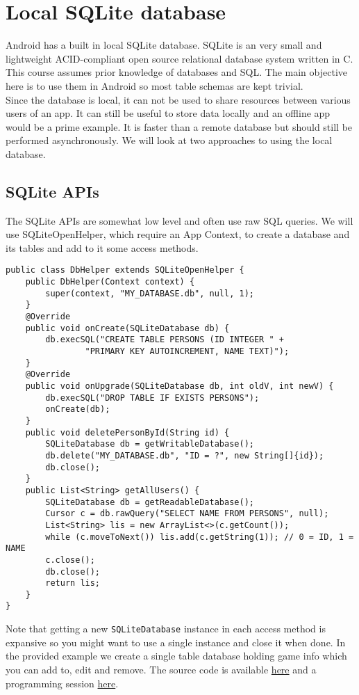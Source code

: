 \section{Local SQLite database}
Android has a built in local SQLite database. SQLite is an very small and lightweight ACID-compliant open source relational database system written in C. This course assumes prior knowledge of databases and SQL. The main objective here is to use them in Android so most table schemas are kept trivial.\\

Since the database is local, it can not be used to share resources between various users of an app. It can still be useful to store data locally and an offline app would be a prime example. It is faster than a remote database but should still be performed asynchronously. We will look at two approaches to using the local database. 

\subsection{SQLite APIs}
The SQLite APIs are somewhat low level and often use raw SQL queries. We will use SQLiteOpenHelper, which require an App Context, to create a database and its tables and add to it some access methods.

\begin{lstlisting}[style=A_Java]
public class DbHelper extends SQLiteOpenHelper {
    public DbHelper(Context context) {
        super(context, "MY_DATABASE.db", null, 1);
    }
    @Override
    public void onCreate(SQLiteDatabase db) {
        db.execSQL("CREATE TABLE PERSONS (ID INTEGER " +
                "PRIMARY KEY AUTOINCREMENT, NAME TEXT)");
    }
    @Override
    public void onUpgrade(SQLiteDatabase db, int oldV, int newV) {
        db.execSQL("DROP TABLE IF EXISTS PERSONS");
        onCreate(db);
    }
    public void deletePersonById(String id) {
        SQLiteDatabase db = getWritableDatabase();
        db.delete("MY_DATABASE.db", "ID = ?", new String[]{id});
        db.close();
    }
    public List<String> getAllUsers() {
        SQLiteDatabase db = getReadableDatabase();
        Cursor c = db.rawQuery("SELECT NAME FROM PERSONS", null);
        List<String> lis = new ArrayList<>(c.getCount());
        while (c.moveToNext()) lis.add(c.getString(1)); // 0 = ID, 1 = NAME
        c.close();
        db.close();
        return lis;
    }
}
\end{lstlisting}
Note that getting a new \texttt{SQLiteDatabase} instance in each access method is expansive so you might want to use a single instance and close it when done. In the provided example we create a single table database holding game info which you can add to, edit and remove. The source code is available \href{https://github.com/JonSteinn/AndroidDevelopment/tree/master/examples/lab5/gamesdb}{here} and a programming session \href{TODO}{here}.


